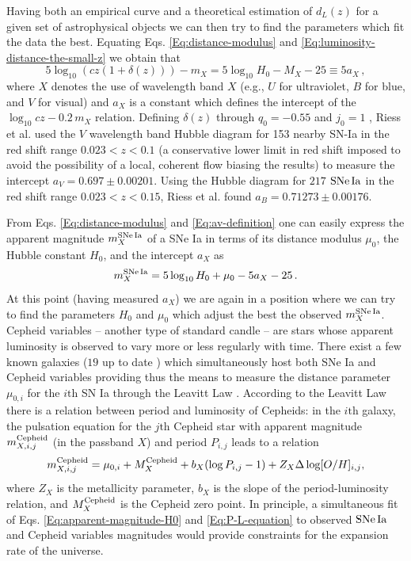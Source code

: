 Having both an empirical curve and a theoretical estimation of $d_L(z)$ for a given set of astrophysical objects we can then try to find the parameters which fit the data the best. Equating Eqs. \eqref{Eq:distance-modulus} and \eqref{Eq:luminosity-distance-the-small-z} we obtain that
\begin{equation}\label{Eq:av-definition}
5 \log_{10} ( c z ( 1+\delta(z) )) - m_X = 5 \log_{10} H_0 - M_X - 25 \equiv 5 a_X \, ,
\end{equation}
where $X$ denotes the use of wavelength band $X$ (e.g., $U$ for ultraviolet, $B$ for blue, and $V$ for visual) and $a_X$ is a constant which defines the intercept of the $\log_{10} cz - 0.2\, m_X$ relation. Defining $\delta(z)$ through $q_0 = -0.55$ and $j_0 = 1$ \cite{Riess:2006fw}, Riess et al. \cite{Riess:2011yx} used the $V$ wavelength band Hubble diagram for 153 nearby SN-Ia in the red shift range $0.023 < z < 0.1$ (a conservative lower limit in red shift imposed to avoid the possibility of a local, coherent flow biasing the results)
to measure the intercept $a_V = 0.697 \pm 0.00201$. Using the Hubble diagram for $217$ $\mathrm{SNe\,Ia}$ in the red shift range $0.023 < z < 0.15$, Riess et al. \cite{Riess:2016jrr} found $a_B = 0.71273 \pm 0.00176$.

From Eqs. \eqref{Eq:distance-modulus} and \eqref{Eq:av-definition} one can easily express the apparent magnitude $m_X^{\mathrm{SNe\,Ia}}$ of a SNe Ia in terms of its distance modulus $\mu_0$, the Hubble constant $H_0$, and the intercept $a_X$ as
\begin{equation}
m_X^{\mathrm{SNe\,Ia}} =  5 \log_{10} H_0 + \mu_0 - 5 a_X - 25 \, . \label{Eq:apparent-magnitude-H0}
\end{equation}
At this point (having measured $a_X$) we are again in a position where we can try to find the parameters $H_0$ and $\mu_0$ which adjust the best the observed $m^{\mathrm{SNe\,Ia}}_X$. Cepheid variables -- another type of standard candle -- are stars whose apparent luminosity is observed to vary more or less regularly with time. There exist a few known galaxies ($19$ up to date \cite{Riess:2016jrr}) which simultaneously host both SNe Ia and Cepheid variables providing thus the means to measure the distance parameter $\mu_{0,i}$ for the $i\mathrm{th}$ SN Ia through the Leavitt Law \cite{1912HarCi.173....1L}. According to the Leavitt Law there is a relation between period and luminosity of Cepheids: in the $i\mathrm{th}$ galaxy, the pulsation equation for the $j\mathrm{th}$ Cepheid star with apparent magnitude $m^{\mathrm{Cepheid}}_{X,i,j}$ (in the passband $X$) and period $P_{i,j}$ leads to a relation 
\begin{equation}\label{Eq:P-L-equation}
m^{\mathrm{Cepheid}}_{X,i,j} = \mu_{0,i} + M^{\mathrm{Cepheid}}_X + b_X (\log P_{i,j}-1) + Z_X \Delta \log[O/H]_{i,j},
\end{equation}
where $Z_X$ is the metallicity parameter, $b_X$ is the slope of the period-luminosity relation, and $M^{\mathrm{Cepheid}}_X$ is the Cepheid zero point. In principle, a simultaneous fit of Eqs. \eqref{Eq:apparent-magnitude-H0} and \eqref{Eq:P-L-equation} to observed $\mathrm{SNe\,Ia}$ and Cepheid variables magnitudes would provide constraints for the expansion rate of the universe. 

